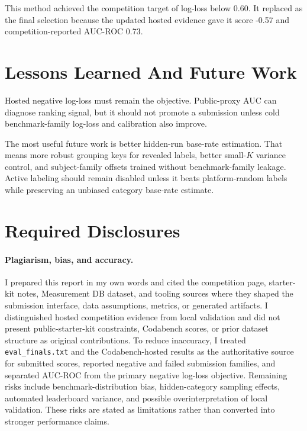\documentclass[11pt]{article}
\begin{document}
This method achieved the competition target of log-loss below 0.60. It replaced  as the final selection because the updated hosted evidence gave it score -0.57 and competition-reported AUC-ROC 0.73.

\section{Lessons Learned And Future Work}
Hosted negative log-loss must remain the objective. Public-proxy AUC can diagnose ranking signal, but it should not promote a submission unless cold benchmark-family log-loss and calibration also improve.

The most useful future work is better hidden-run base-rate estimation. That means more robust grouping keys for revealed labels, better small-\(K\) variance control, and subject-family offsets trained without benchmark-family leakage. Active labeling should remain disabled unless it beats platform-random labels while preserving an unbiased category base-rate estimate.

\section{Required Disclosures}
\paragraph{Plagiarism, bias, and accuracy.}
I prepared this report in my own words and cited the competition page, starter-kit notes, Measurement DB dataset, and tooling sources where they shaped the submission interface, data assumptions, metrics, or generated artifacts. I distinguished hosted competition evidence from local validation and did not present public-starter-kit constraints, Codabench scores, or prior dataset structure as original contributions. To reduce inaccuracy, I treated \texttt{eval\_finals.txt} and the Codabench-hosted results as the authoritative source for submitted scores, reported negative and failed submission families, and separated AUC-ROC from the primary negative log-loss objective. Remaining risks include benchmark-distribution bias, hidden-category sampling effects, automated leaderboard variance, and possible overinterpretation of local validation. These risks are stated as limitations rather than converted into stronger performance claims.
\end{document}
